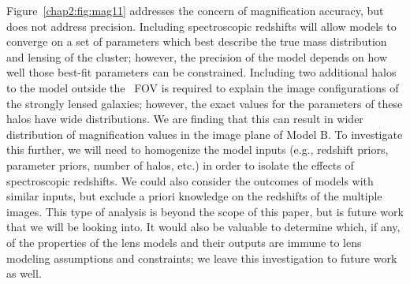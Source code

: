 Figure~\ref{chap2:fig:mag11} addresses the concern of magnification accuracy, but does not address precision. Including spectroscopic redshifts will allow models to converge on a set of parameters which best describe the true mass distribution and lensing of the cluster; however, the precision of the model depends on how well those best-fit parameters can be constrained. Including two additional halos to the model outside the \hst\ FOV is required to explain the image configurations of the strongly lensed galaxies; however, the exact values for the parameters of these halos have wide distributions. We are finding that this can result in wider distribution of magnification values in the image plane of Model B. To investigate this further, we will need to homogenize the model inputs (e.g., redshift priors, parameter priors, number of halos, etc.) in order to isolate the effects of spectroscopic redshifts. We could also consider the outcomes of models with similar inputs, but exclude a priori knowledge on the redshifts of the multiple images. This type of analysis is beyond the scope of this paper, but is future work that we will be looking into. It would also be valuable to determine which, if any, of the properties of the lens models and their outputs are immune to lens modeling assumptions and constraints; we leave this investigation to future work as well.

